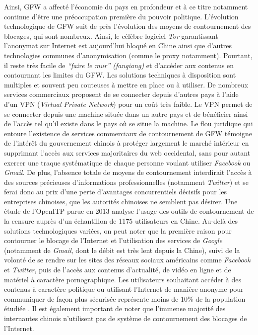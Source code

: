 Ainsi, GFW a affecté l’économie du pays en profondeur et à ce titre notamment continue d’être une préoccupation première du pouvoir politique. L’évolution technologique de GFW suit de près l’évolution des moyens de contournement des blocages, qui sont nombreux. Ainsi, le célèbre logiciel \textit{Tor} garantissant l’anonymat sur Internet est aujourd’hui bloqué en Chine \citep{Winter2012} ainsi que d’autres technologies communes d’anonymisation (comme le proxy notamment). Pourtant, il reste très facile de \textit{“faire le mur” (fanqiang)} et d’accéder aux contenus en contournant les limites du GFW. Les solutions techniques à disposition sont multiples et souvent peu couteuses à mettre en place ou à utiliser. De nombreux services commerciaux proposent de se connecter depuis d’autres pays à l’aide d’un VPN (\textit{Virtual Private Network}) pour un coût très faible. Le VPN permet de se connecter depuis une machine située dans un autre pays et de bénéficier ainsi de l’accès tel qu’il existe dans le pays où se situe la machine. Le flou juridique qui entoure l’existence de services commerciaux de contournement de GFW témoigne de l’intérêt du gouvernement chinois à protéger largement le marché intérieur en supprimant l’accès aux services majoritaires du web occidental, sans pour autant exercer une traque systématique de chaque personne voulant utiliser \textit{Facebook} ou \textit{Gmail}. De plus, l’absence totale de moyens de contournement interdirait l’accès à des sources précieuses d’informations professionnelles (notamment \textit{Twitter}) et se ferai donc au prix d’une perte d’avantages concurrentiels décisifs pour les entreprises chinoises, que les autorités chinoises ne semblent pas désirer. Une étude de l’OpenITP parue en 2013 analyse l’usage des outils de contournement de la censure auprès d’un échantillon de 1175 utilisateurs en Chine. Au-delà des solutions technologiques variées, on peut noter que la première raison pour contourner le blocage de l’Internet et l’utilisation des services de \textit{Google} (notamment de \textit{Gmail}, dont le débit est très lent depuis la Chine), suivi de la volonté de se rendre sur les sites des réseaux sociaux américains comme \textit{Facebook} et \textit{Twitter}, puis de l’accès aux contenus d’actualité, de vidéo en ligne et de matériel à caractère pornographique. Les utilisateurs souhaitant accéder à des contenus à caractère politique ou utilisant l’Internet de manière anonyme pour communiquer de façon plus sécurisée représente moins de 10\% de la population étudiée \citep{OpenITP2013}. Il est également important de noter que l’immense majorité des internautes chinois n’utilisent pas de système de contournement des blocages de l’Internet. 

